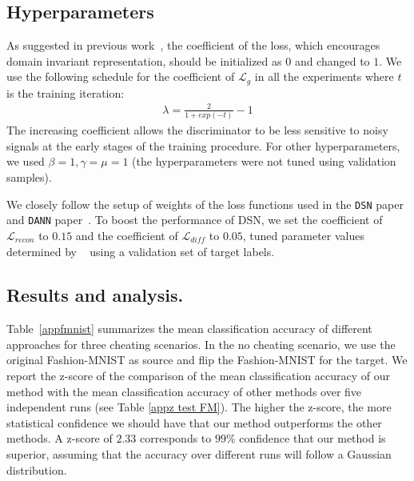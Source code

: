\documentclass{article}
\begin{document}
\subsection{Hyperparameters}\label{apphyper}
As suggested in previous work~\cite{ganin2016domain}, the coefficient of the loss, which encourages domain invariant representation, should be initialized as $0$ and changed to $1$. We use the following schedule for the coefficient of $\mathcal{L}_g$ in all the experiments where $t$ is the training iteration:
\begin{align}
    \lambda = \frac{2}{1 + exp(-t)}-1
\end{align}%
The increasing coefficient allows the discriminator to be less sensitive to noisy signals at the early stages of the training procedure. For other hyperparameters, we used $\beta =1, \gamma =\mu=1$ (the hyperparameters were not tuned using validation samples).  

We closely follow the  setup of weights of the loss functions used in the \verb"DSN" paper~\cite{bousmalis2016domain} and \verb"DANN" paper~\cite{ganin2016domain}. To boost the performance of DSN, we set the coefficient of $\mathcal{L}_{\mathit{recon}}$ to $0.15$ and the coefficient of $\mathcal{L}_{\mathit{diff}}$ to $0.05$, tuned parameter values determined by ~\cite{bousmalis2016domain} using a validation set of target labels.

\subsection{Results and analysis.}



Table~\ref{appfmnist} summarizes the mean classification accuracy of different approaches for three cheating scenarios. In the no cheating scenario, we use the original Fashion-MNIST as source and flip the Fashion-MNIST for the target. We report the z-score of the comparison of the mean classification accuracy of our method with the mean classification accuracy of other methods over five independent runs (see Table \ref{appz test FM}). The higher the z-score, the more statistical confidence we should have that our method outperforms the other methods. A z-score of $2.33$ corresponds to $99\%$ confidence that our method is superior, assuming that the accuracy over different runs will follow a  Gaussian distribution. 
\end{document}
